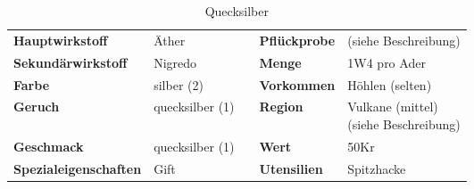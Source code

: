 \begin{table}[h] 
\begin{center} 
\begin{tabular}{|l|l|p{1cm}|l|l|} 
  	\cline{1-2} \cline{4-5} 
  	\textbf{Hauptwirkstoff} & Äther && \textbf{Pflückprobe} & (siehe Beschreibung) \\ \cline{1-2} \cline{4-5} 
  	\textbf{Sekundärwirkstoff} & Nigredo && \textbf{Menge} & 1W4 pro Ader \\ \cline{1-2} \cline{4-5} 
  	\textbf{Farbe} & silber (2) && \textbf{Vorkommen} & Höhlen (selten) \\ \cline{1-2} \cline{4-5} 
  	\textbf{Geruch} & quecksilber (1) && \textbf{Region} & \brcell{Vulkane (mittel) \\ (siehe Beschreibung)} \\ \cline{1-2} \cline{4-5} 
  	\textbf{Geschmack} & quecksilber (1) && \textbf{Wert} & 50Kr \\ \cline{1-2} \cline{4-5} 
  	\textbf{Spezialeigenschaften} & Gift && \textbf{Utensilien} & Spitzhacke \\ \cline{1-2} \cline{4-5} 
\end{tabular} 
\end{center} 
\caption{Quecksilber} 
\label{tab:quecksilber} 
\end{table}